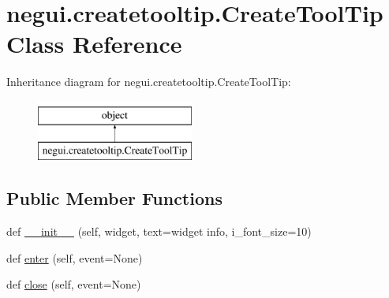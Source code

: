 \hypertarget{classnegui_1_1createtooltip_1_1CreateToolTip}{}\section{negui.\+createtooltip.\+Create\+Tool\+Tip Class Reference}
\label{classnegui_1_1createtooltip_1_1CreateToolTip}
Inheritance diagram for negui.\+createtooltip.\+Create\+Tool\+Tip\+:\begin{figure}[H]
\begin{center}
\leavevmode
\includegraphics[height=2.000000cm]{classnegui_1_1createtooltip_1_1CreateToolTip}
\end{center}
\end{figure}
\subsection*{Public Member Functions}
\begin{DoxyCompactItemize}
\item 
def \hyperlink{classnegui_1_1createtooltip_1_1CreateToolTip_aec360f7f4bfc95876b04ad68a7c54140}{\+\_\+\+\_\+init\+\_\+\+\_\+} (self, widget, text=\textquotesingle{}widget info\textquotesingle{}, i\+\_\+font\+\_\+size=10)
\item 
def \hyperlink{classnegui_1_1createtooltip_1_1CreateToolTip_ab37624e73833e8ba485d10410c5986bb}{enter} (self, event=None)
\item 
def \hyperlink{classnegui_1_1createtooltip_1_1CreateToolTip_aa6f6887d11b3e07e5f6e12b267412fae}{close} (self, event=None)
\end{DoxyCompactItemize}

